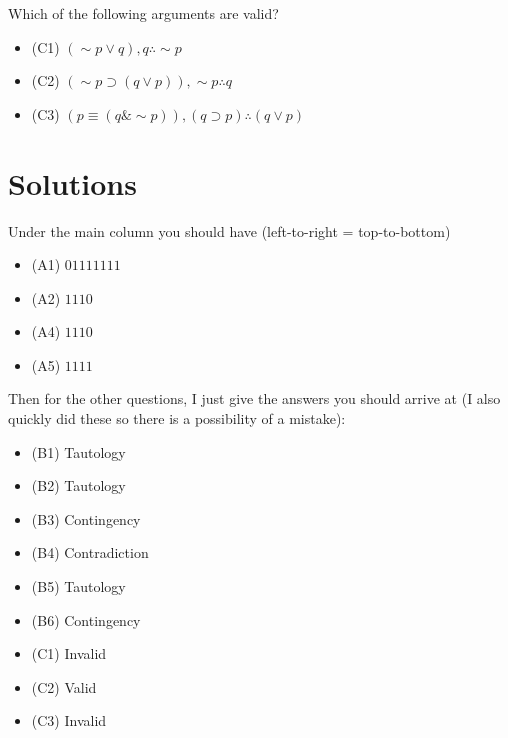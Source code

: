 \documentclass[
]{book}
\providecommand{\tightlist}{%
  \setlength{\itemsep}{0pt}\setlength{\parskip}{0pt}}
\begin{document}
Which of the following arguments are valid?

\begin{itemize}
\tightlist
\item
  (C1) \((\sim p \lor q), q \therefore \sim p\)
\item
  (C2) \((\sim p \supset (q \lor p)), \sim p \therefore q\)
\item
  (C3) \((p \equiv (q \& \sim p)), (q\supset p) \therefore (q \lor p)\)
\end{itemize}

\hypertarget{solutions}{%
\section{Solutions}\label{solutions}}

Under the main column you should have (left-to-right = top-to-bottom)

\begin{itemize}
\tightlist
\item
  (A1) \(01111111\)
\item
  (A2) \(1110\)
\item
  (A4) \(1110\)
\item
  (A5) \(1111\)
\end{itemize}

Then for the other questions, I just give the answers you should arrive at (I also quickly did these so there is a possibility of a mistake):

\begin{itemize}
\tightlist
\item
  (B1) Tautology
\item
  (B2) Tautology
\item
  (B3) Contingency
\item
  (B4) Contradiction
\item
  (B5) Tautology
\item
  (B6) Contingency
\item
  (C1) Invalid
\item
  (C2) Valid
\item
  (C3) Invalid
\end{itemize}

  
\end{document}
